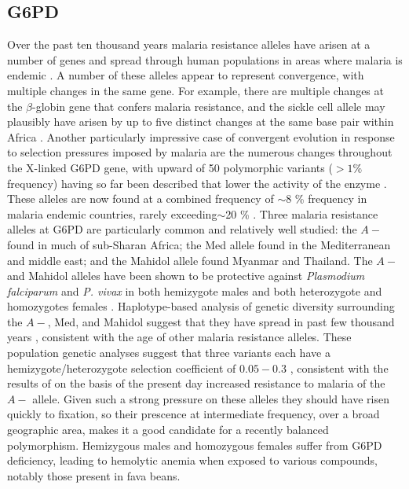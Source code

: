 \documentclass{article}
\begin{document}
\subsection{G6PD}

Over the past ten thousand years malaria resistance alleles have arisen at a number
of genes and spread through human populations in areas where malaria is endemic \citep{Kwiatkowski:05}. 
A number of these alleles appear to represent convergence, with
multiple changes in the same gene. 
For example, there are multiple
changes at the $\beta$-globin gene that confers malaria resistance,
and the sickle cell allele may plausibly have arisen by up to five distinct
changes at the same base pair within Africa
\citep{Flint:98,ralph2010parallel}.
Another particularly impressive case of convergent evolution in response to
selection pressures imposed by malaria are the numerous changes throughout the
X-linked G6PD gene, with upward of 50 polymorphic variants ($>1\%$ frequency) having so far been
described that lower the activity of the enzyme \citep{Howes-g6pd-variants,Minucci-g6pd}. These alleles are now
found at a combined frequency of $\sim$8 \% frequency in malaria endemic countries, rarely
exceeding$\sim$20 \% \citep{Howes-g6pd-preval}. Three malaria
resistance alleles at G6PD are particularly common and relatively well
studied: the $A-$ found in
much of sub-Sharan Africa; the Med allele found in the Mediterranean and middle
east; and the Mahidol allele found Myanmar and Thailand.
The $A-$ and Mahidol alleles have been shown
to be protective against {\it Plasmodium falciparum} and {\it P. vivax} in both
hemizygote males and both heterozygote and homozygotes females \citep{Ruwende-g6pd ,
Louicharoen-g6pd}. Haplotype-based analysis of genetic diversity surrounding
the $A-$, Med, and Mahidol suggest that they have spread in past few
thousand years \citet{tishkoff-g6pd, Slatkin-age-est,Saunders-g6pd,Louicharoen-g6pd}, 
consistent with the age of other malaria resistance alleles. 
These population genetic analyses suggest that three variants each have a hemizygote/heterozygote 
selection coefficient of $0.05-0.3$ \citep{tishkoff-g6pd
  Slatkin-age-est,Saunders-g6pd,Louicharoen-g6pd}, consistent with
the results of \citet{Ruwende-g6pd} on the basis of the present day increased resistance to malaria of the
$A-$ allele. 
Given such a strong pressure on these alleles they should have risen
quickly to fixation, so their prescence at intermediate frequency,
over a broad geographic area, makes it a good candidate for a recently
balanced polymorphism. 
Hemizygous males and homozygous females suffer from G6PD deficiency,
leading to hemolytic anemia when exposed to various compounds, notably
those present in fava beans. 
\end{document}
